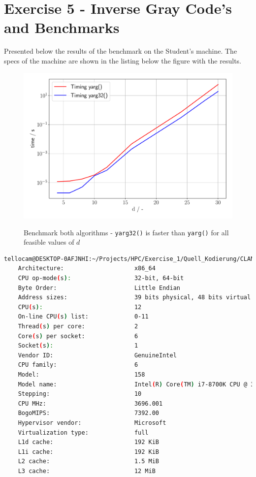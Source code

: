 \section{Exercise 5 - Inverse Gray Code's and Benchmarks}
Presented below the results of the benchmark on the Student's machine. The specs of the machine are shown in the listing below the figure with the results.

\begin{figure}[h]
    \begin{center}
        \includegraphics[width= 0.88\linewidth]{figures/task_5_plot.pdf} 
        \label{ref_plot_task_5}
        \caption{Benchmark both algorithms - \texttt{yarg32()} is faster than \texttt{yarg()} for all feasible values of $d$}
    \end{center}
\end{figure}


\begin{lstlisting}[language=bash, title=Linux Terminal Output of \texttt{lscpu}]
    tellocam@DESKTOP-0AFJNHI:~/Projects/HPC/Exercise_1/Quell_Kodierung/CLANG$ lscpu
    Architecture:                    x86_64
    CPU op-mode(s):                  32-bit, 64-bit
    Byte Order:                      Little Endian
    Address sizes:                   39 bits physical, 48 bits virtual
    CPU(s):                          12
    On-line CPU(s) list:             0-11
    Thread(s) per core:              2
    Core(s) per socket:              6
    Socket(s):                       1
    Vendor ID:                       GenuineIntel
    CPU family:                      6
    Model:                           158
    Model name:                      Intel(R) Core(TM) i7-8700K CPU @ 3.70GHz
    Stepping:                        10
    CPU MHz:                         3696.001
    BogoMIPS:                        7392.00
    Hypervisor vendor:               Microsoft
    Virtualization type:             full
    L1d cache:                       192 KiB
    L1i cache:                       192 KiB
    L2 cache:                        1.5 MiB
    L3 cache:                        12 MiB
 
\end{lstlisting}

